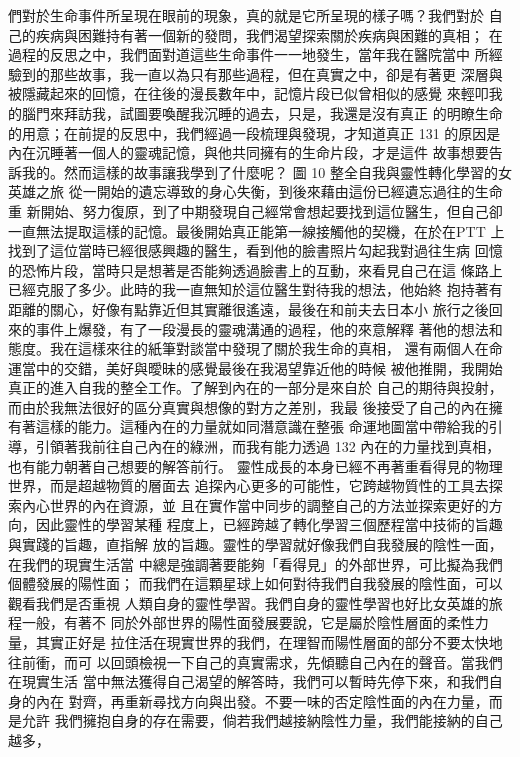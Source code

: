 們對於生命事件所呈現在眼前的現象，真的就是它所呈現的樣子嗎？我們對於
自己的疾病與困難持有著一個新的發問，我們渴望探索關於疾病與困難的真相；
在過程的反思之中，我們面對道這些生命事件一一地發生，當年我在醫院當中
所經驗到的那些故事，我一直以為只有那些過程，但在真實之中，卻是有著更
深層與被隱藏起來的回憶，在往後的漫長數年中，記憶片段已似曾相似的感覺
來輕叩我的腦門來拜訪我，試圖要喚醒我沉睡的過去，只是，我還是沒有真正
的明瞭生命的用意；在前提的反思中，我們經過一段梳理與發現，才知道真正
131 
的原因是內在沉睡著一個人的靈魂記憶，與他共同擁有的生命片段，才是這件
故事想要告訴我的。然而這樣的故事讓我學到了什麼呢？ 
圖 10 
整全自我與靈性轉化學習的女英雄之旅 
從一開始的遺忘導致的身心失衡，到後來藉由這份已經遺忘過往的生命重
新開始、努力復原，到了中期發現自己經常會想起要找到這位醫生，但自己卻
一直無法提取這樣的記憶。最後開始真正能第一線接觸他的契機，在於在PTT
上找到了這位當時已經很感興趣的醫生，看到他的臉書照片勾起我對過往生病
回憶的恐怖片段，當時只是想著是否能夠透過臉書上的互動，來看見自己在這
條路上已經克服了多少。此時的我一直無知於這位醫生對待我的想法，他始終
抱持著有距離的關心，好像有點靠近但其實離很遙遠，最後在和前夫去日本小
旅行之後回來的事件上爆發，有了一段漫長的靈魂溝通的過程，他的來意解釋
著他的想法和態度。我在這樣來往的紙筆對談當中發現了關於我生命的真相，
還有兩個人在命運當中的交錯，美好與曖昧的感覺最後在我渴望靠近他的時候
被他推開，我開始真正的進入自我的整全工作。了解到內在的一部分是來自於
自己的期待與投射，而由於我無法很好的區分真實與想像的對方之差別，我最
後接受了自己的內在擁有著這樣的能力。這種內在的力量就如同潛意識在整張
命運地圖當中帶給我的引導，引領著我前往自己內在的綠洲，而我有能力透過
132 
內在的力量找到真相，也有能力朝著自己想要的解答前行。 
靈性成長的本身已經不再著重看得見的物理世界，而是超越物質的層面去
追探內心更多的可能性，它跨越物質性的工具去探索內心世界的內在資源，並
且在實作當中同步的調整自己的方法並探索更好的方向，因此靈性的學習某種
程度上，已經跨越了轉化學習三個歷程當中技術的旨趣與實踐的旨趣，直指解
放的旨趣。靈性的學習就好像我們自我發展的陰性一面，在我們的現實生活當
中總是強調著要能夠「看得見」的外部世界，可比擬為我們個體發展的陽性面；
而我們在這顆星球上如何對待我們自我發展的陰性面，可以觀看我們是否重視
人類自身的靈性學習。我們自身的靈性學習也好比女英雄的旅程一般，有著不
同於外部世界的陽性面發展要說，它是屬於陰性層面的柔性力量，其實正好是
拉住活在現實世界的我們，在理智而陽性層面的部分不要太快地往前衝，而可
以回頭檢視一下自己的真實需求，先傾聽自己內在的聲音。當我們在現實生活
當中無法獲得自己渴望的解答時，我們可以暫時先停下來，和我們自身的內在
對齊，再重新尋找方向與出發。不要一味的否定陰性面的內在力量，而是允許
我們擁抱自身的存在需要，倘若我們越接納陰性力量，我們能接納的自己越多，
